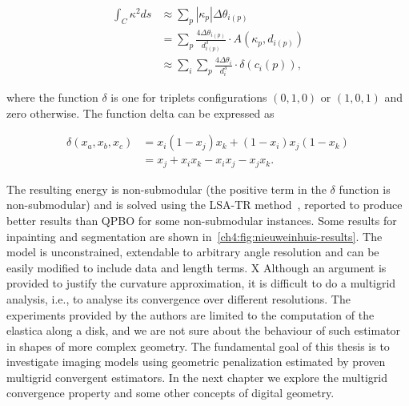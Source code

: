 \begin{align*}
	\int_{C}{\kappa ^2 ds} &\approx \sum_{p}{ |\kappa_{p}|\Delta \theta_{i(p)}} \\
	&= \sum_{p} \frac{4\Delta \theta _{i(p)}}{d^3_{i(p)}} \cdot A(\kappa_p,d_{i(p)}) \\
	&\approx \sum_{i}\sum_{p} \frac{4\Delta \theta _i}{d^3_i} \cdot \delta(c_i(p)),
\end{align*}

where the function $\delta$ is one for triplets configurations $(0,1,0)$ or $(1,0,1)$ and zero otherwise. The function delta can be expressed as

\begin{align*}
	\delta(x_a,x_b,x_c) &= x_i(1-x_j)x_k + (1-x_i)x_j(1-x_k) \\
	&= x_j + x_ix_k - x_ix_j - x_jx_k.
\end{align*}

The resulting energy is non-submodular (the positive term in the $\delta$ function is non-submodular) and is solved using the LSA-TR method~\cite{gorelick14local}, reported to produce better results than QPBO for some non-submodular instances. Some results for inpainting and segmentation are shown in~\cref{ch4:fig:nieuweinhuis-results}. The model is unconstrained, extendable to arbitrary angle resolution and can be easily modified to include data and length terms. 
X
Although an argument is provided to justify the curvature approximation, it is difficult to do a multigrid analysis, i.e., to analyse its convergence over different resolutions. The experiments provided by the authors are limited to the computation of the elastica along a disk, and we are not sure about the behaviour of such estimator in shapes of more complex geometry. The fundamental goal of this thesis is to investigate imaging models using geometric penalization estimated by proven multigrid convergent estimators. In the next chapter we explore the multigrid convergence property and some other concepts of digital geometry.

